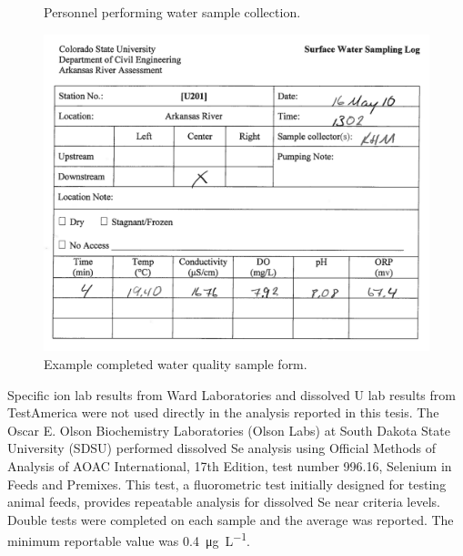 \begin{linenumbers}
\begin{figure}[htbp]
\centering
	\hspace{4em}%
	\caption[Personnel performing water sample collection.]{Personnel performing water sample collection.}
	\label{pic:sampling}
\end{figure}

\begin{figure}[htbp]
	\centering
	\includegraphics[width=6in]{Figures/SampleLogFilled}
	\caption[Example completed water quality sample form.]{Example completed water quality sample form.}
	\label{fig:samplogComplete}
\end{figure}

Specific ion lab results from Ward Laboratories and dissolved U lab results from TestAmerica were not used directly in the analysis reported in this tesis.  The Oscar E. Olson Biochemistry Laboratories (Olson Labs) at South Dakota State University (SDSU) performed dissolved Se analysis using Official Methods of Analysis of AOAC International, 17th Edition, test number 996.16, Selenium in Feeds and Premixes.  This test, a fluorometric test initially designed for testing animal feeds, provides repeatable analysis for dissolved Se near criteria levels.  Double tests were completed on each sample and the average was reported.  The minimum reportable value was \SI{0.4}{\micro\gram\per\liter}.  


\end{linenumbers}
